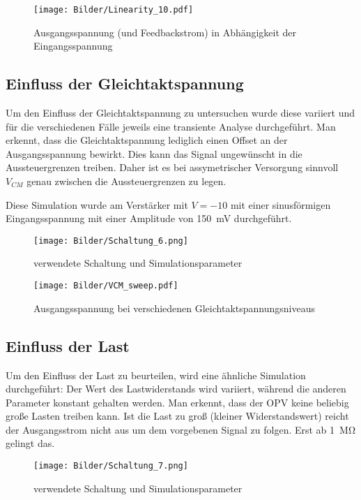 \begin{figure}[H]
    \centering
    \texttt{[image: Bilder/Linearity\_10.pdf]}
    \caption{Ausgangsspannung (und Feedbackstrom) in Abhängigkeit der Eingangsspannung}
    \label{fig:my_label}
\end{figure}

\subsection{Einfluss der Gleichtaktspannung}

Um den Einfluss der Gleichtaktspannung zu untersuchen wurde diese variiert und für die verschiedenen Fälle jeweils eine transiente Analyse durchgeführt. Man erkennt, dass die Gleichtaktspannung lediglich einen Offset an der Ausgangsspannung bewirkt. Dies kann das Signal ungewünscht in die Aussteuergrenzen treiben. Daher ist es bei assymetrischer Versorgung sinnvoll $V_{CM}$ genau zwischen die Aussteuergrenzen zu legen.

Diese Simulation wurde am Verstärker mit $V = -10$ mit einer sinusförmigen Eingangsspannung mit einer Amplitude von \SI{150}{\milli \volt} durchgeführt.

\begin{figure}[H]
    \centering
    \texttt{[image: Bilder/Schaltung\_6.png]}
    \caption{verwendete Schaltung und Simulationsparameter}
\end{figure}

\begin{figure}[H]
    \centering
    \texttt{[image: Bilder/VCM\_sweep.pdf]}
    \caption{Ausgangsspannung bei verschiedenen Gleichtaktspannungsniveaus}
    \label{fig:my_label}
\end{figure}

\subsection{Einfluss der Last}

Um den Einfluss der Last zu beurteilen, wird eine ähnliche Simulation durchgeführt: Der Wert des Lastwiderstands wird variiert, während die anderen Parameter konstant gehalten werden. Man erkennt, dass der OPV keine beliebig große Lasten treiben kann. Ist die Last zu groß (kleiner Widerstandswert) reicht der Ausgangsstrom nicht aus um dem vorgebenen Signal zu folgen. Erst ab \SI{1}{\mega \ohm} gelingt das.

\begin{figure}[H]
    \centering
    \texttt{[image: Bilder/Schaltung\_7.png]}
    \caption{verwendete Schaltung und Simulationsparameter}
\end{figure}

